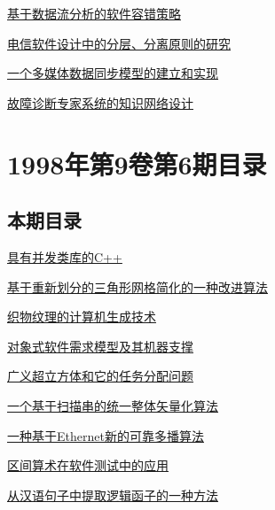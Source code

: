 \documentclass[a4paper]{article}
\begin{document}
\href{http://www.jos.org.cn/ch/reader/download_pdf.aspx?file_no=19980711&year_id=1998&quarter_id=7&falg=1}{基于数据流分析的软件容错策略}

\href{http://www.jos.org.cn/ch/reader/download_pdf.aspx?file_no=19980712&year_id=1998&quarter_id=7&falg=1}{电信软件设计中的分层、分离原则的研究}

\href{http://www.jos.org.cn/ch/reader/download_pdf.aspx?file_no=19980713&year_id=1998&quarter_id=7&falg=1}{一个多媒体数据同步模型的建立和实现}

\href{http://www.jos.org.cn/ch/reader/download_pdf.aspx?file_no=19980714&year_id=1998&quarter_id=7&falg=1}{故障诊断专家系统的知识网络设计}


\section{\textbf{1998年第9卷第6期目录}}
\subsection{本期目录}
\href{http://www.jos.org.cn/ch/reader/download_pdf.aspx?file_no=19980601&year_id=1998&quarter_id=6&falg=1}{具有并发类库的C++}

\href{http://www.jos.org.cn/ch/reader/download_pdf.aspx?file_no=19980602&year_id=1998&quarter_id=6&falg=1}{基于重新划分的三角形网格简化的一种改进算法}

\href{http://www.jos.org.cn/ch/reader/download_pdf.aspx?file_no=19980603&year_id=1998&quarter_id=6&falg=1}{织物纹理的计算机生成技术}

\href{http://www.jos.org.cn/ch/reader/download_pdf.aspx?file_no=19980604&year_id=1998&quarter_id=6&falg=1}{对象式软件需求模型及其机器支撑}

\href{http://www.jos.org.cn/ch/reader/download_pdf.aspx?file_no=19980605&year_id=1998&quarter_id=6&falg=1}{广义超立方体和它的任务分配问题}

\href{http://www.jos.org.cn/ch/reader/download_pdf.aspx?file_no=19980606&year_id=1998&quarter_id=6&falg=1}{一个基于扫描串的统一整体矢量化算法}

\href{http://www.jos.org.cn/ch/reader/download_pdf.aspx?file_no=19980607&year_id=1998&quarter_id=6&falg=1}{一种基于Ethernet新的可靠多播算法}

\href{http://www.jos.org.cn/ch/reader/download_pdf.aspx?file_no=19980608&year_id=1998&quarter_id=6&falg=1}{区间算术在软件测试中的应用}

\href{http://www.jos.org.cn/ch/reader/download_pdf.aspx?file_no=19980609&year_id=1998&quarter_id=6&falg=1}{从汉语句子中提取逻辑函子的一种方法}
\end{document}
